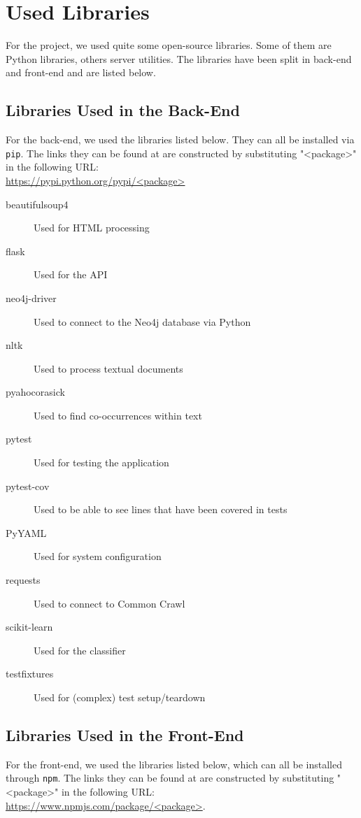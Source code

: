 \chapter{Used Libraries} \label{apx:used-libs}
For the project, we used quite some open-source libraries. Some of them are Python libraries, others server utilities. The libraries have been split in back-end and front-end and are listed below.

\section{Libraries Used in the Back-End}
For the back-end, we used the libraries listed below. They can all be installed via \texttt{pip}. The links they can be found at are constructed by substituting "<package>" in the following URL:\\ \url{https://pypi.python.org/pypi/<package>}

\begin{description}
    \item[beautifulsoup4] Used for HTML processing
    \item[flask] Used for the API
    \item[neo4j-driver] Used to connect to the Neo4j database via Python
    \item[nltk] Used to process textual documents
    \item[pyahocorasick] Used to find co-occurrences within text
    \item[pytest] Used for testing the application
    \item[pytest-cov] Used to be able to see lines that have been covered in tests
    \item[PyYAML] Used for system configuration
    \item[requests] Used to connect to Common Crawl
    \item[scikit-learn] Used for the classifier
    \item[testfixtures] Used for (complex) test setup/teardown
\end{description}

\section{Libraries Used in the Front-End}
For the front-end, we used the libraries listed below, which can all be installed through \texttt{npm}. The links they can be found at are constructed by substituting "<package>" in the following URL:\\ \url{https://www.npmjs.com/package/<package>}. 

